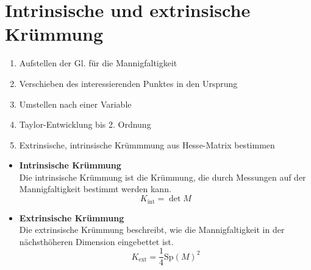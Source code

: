 \documentclass{article}
\begin{document}
\newpage


\section{Intrinsische und extrinsische Krümmung}
	\begin{enumerate}
		\item Aufstellen der  Gl. für die Mannigfaltigkeit
		
		\item Verschieben des interessierenden Punktes in den Ursprung
		
		\item Umstellen nach einer Variable
		
		\item Taylor-Entwicklung bis 2. Ordnung
		
		\item Extrinsische, intrinsische Krümmmung aus Hesse-Matrix bestimmen
	\end{enumerate}


	\begin{itemize}
		\item \textbf{Intrinsische Krümmung}\\
		Die intrinsische Krümmung ist die Krümmung, die durch Messungen auf der Mannigfaltigkeit bestimmt werden kann.
			\begin{equation}
				K_{\text{int}} = \det M
			\end{equation}
		
		\item \textbf{Extrinsische Krümmung}\\
		Die extrinsische Krümmung beschreibt, wie die Mannigfaltigkeit in der nächsthöheren Dimension eingebettet ist.
			\begin{equation}
				K_{\text{ext}} = \frac{1}{4} \text{Sp}(M)^2
			\end{equation}
	\end{itemize}

\vspace{0.5cm}
\end{document}
